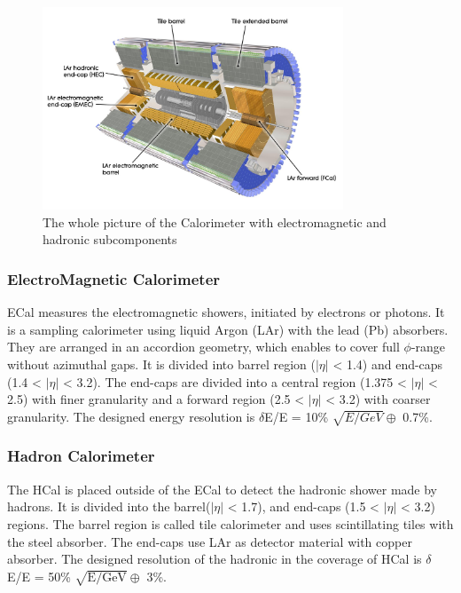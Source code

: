 \begin{figure}[tbp]
\begin{center}
 \includegraphics[width=0.8\textwidth,keepaspectratio]{figures/detector/Calo}
\caption{
The whole picture of the Calorimeter with electromagnetic and hadronic subcomponents
}
\label{fig:calo}
\end{center}
\end{figure}


\subsubsection{ElectroMagnetic Calorimeter}
ECal measures the electromagnetic showers, initiated by electrons or photons. It is a sampling calorimeter using liquid Argon (LAr) with the lead (Pb) absorbers. They are arranged in an accordion geometry, which enables to cover full $\phi$-range without azimuthal gaps. It is divided into barrel region ($|\eta|$ < 1.4) and end-caps (1.4 < $|\eta|$ < 3.2). The end-caps are divided into a central region (1.375 < $|\eta|$ < 2.5) with finer granularity and a forward region (2.5 < $|\eta|$ < 3.2) with coarser granularity. The designed energy resolution is $\delta$E/E = 10\% $\sqrt{E/GeV} \oplus$ 0.7\%.

\subsubsection{Hadron Calorimeter}
The HCal is placed outside of the ECal to detect the hadronic shower made by hadrons.
It is divided into the barrel($|\eta|$ < 1.7), and end-caps (1.5 < $|\eta|$ < 3.2) regions. 
The barrel region is called tile calorimeter and uses scintillating tiles with the steel absorber. 
The end-caps use LAr as detector material with copper absorber. 
The designed resolution of the hadronic in the coverage of HCal is $\delta$E/E = 50\% $\sqrt{\mathrm{E/GeV}} \oplus$ 3\%.

